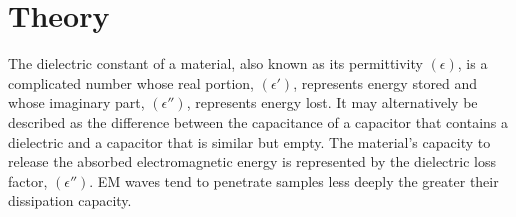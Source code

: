 \section{Theory}

	The dielectric constant of a material, also known as its permittivity $(\epsilon)$, is a complicated number whose real portion, $(\epsilon')$, represents energy stored and whose imaginary part, $(\epsilon'')$, represents energy lost. It may alternatively be described as the difference between the capacitance of a capacitor that contains a dielectric and a capacitor that is similar but empty. The material's capacity to release the absorbed electromagnetic energy is represented by the dielectric loss factor, $(\epsilon'')$. EM waves tend to penetrate samples less deeply the greater their dissipation capacity.

